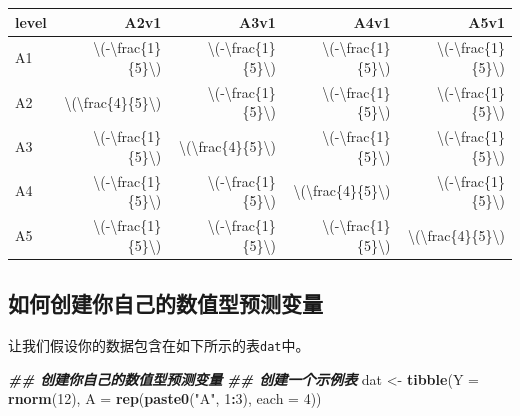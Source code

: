 \documentclass[
]{book}
\newenvironment{Shaded}{\begin{snugshade}}{\end{snugshade}}
\newcommand{\AttributeTok}[1]{\textcolor[rgb]{0.13,0.29,0.53}{#1}}
\newcommand{\DecValTok}[1]{\textcolor[rgb]{0.00,0.00,0.81}{#1}}
\newcommand{\DocumentationTok}[1]{\textcolor[rgb]{0.56,0.35,0.01}{\textbf{\textit{#1}}}}
\newcommand{\FunctionTok}[1]{\textcolor[rgb]{0.13,0.29,0.53}{\textbf{#1}}}
\newcommand{\NormalTok}[1]{#1}
\newcommand{\OtherTok}[1]{\textcolor[rgb]{0.56,0.35,0.01}{#1}}
\newcommand{\SpecialCharTok}[1]{\textcolor[rgb]{0.81,0.36,0.00}{\textbf{#1}}}
\newcommand{\StringTok}[1]{\textcolor[rgb]{0.31,0.60,0.02}{#1}}
\begin{document}
\begin{table}
\centering
\begin{tabular}{l|r|r|r|r}
\hline
level & A2v1 & A3v1 & A4v1 & A5v1\\
\hline
A1 & \textbackslash{}(-\textbackslash{}frac\{1\}\{5\}\textbackslash{}) & \textbackslash{}(-\textbackslash{}frac\{1\}\{5\}\textbackslash{}) & \textbackslash{}(-\textbackslash{}frac\{1\}\{5\}\textbackslash{}) & \textbackslash{}(-\textbackslash{}frac\{1\}\{5\}\textbackslash{})\\
\hline
A2 & \textbackslash{}(\textbackslash{}frac\{4\}\{5\}\textbackslash{}) & \textbackslash{}(-\textbackslash{}frac\{1\}\{5\}\textbackslash{}) & \textbackslash{}(-\textbackslash{}frac\{1\}\{5\}\textbackslash{}) & \textbackslash{}(-\textbackslash{}frac\{1\}\{5\}\textbackslash{})\\
\hline
A3 & \textbackslash{}(-\textbackslash{}frac\{1\}\{5\}\textbackslash{}) & \textbackslash{}(\textbackslash{}frac\{4\}\{5\}\textbackslash{}) & \textbackslash{}(-\textbackslash{}frac\{1\}\{5\}\textbackslash{}) & \textbackslash{}(-\textbackslash{}frac\{1\}\{5\}\textbackslash{})\\
\hline
A4 & \textbackslash{}(-\textbackslash{}frac\{1\}\{5\}\textbackslash{}) & \textbackslash{}(-\textbackslash{}frac\{1\}\{5\}\textbackslash{}) & \textbackslash{}(\textbackslash{}frac\{4\}\{5\}\textbackslash{}) & \textbackslash{}(-\textbackslash{}frac\{1\}\{5\}\textbackslash{})\\
\hline
A5 & \textbackslash{}(-\textbackslash{}frac\{1\}\{5\}\textbackslash{}) & \textbackslash{}(-\textbackslash{}frac\{1\}\{5\}\textbackslash{}) & \textbackslash{}(-\textbackslash{}frac\{1\}\{5\}\textbackslash{}) & \textbackslash{}(\textbackslash{}frac\{4\}\{5\}\textbackslash{})\\
\hline
\end{tabular}
\end{table}

\hypertarget{ux5982ux4f55ux521bux5efaux4f60ux81eaux5df1ux7684ux6570ux503cux578bux9884ux6d4bux53d8ux91cf}{%
\subsection{如何创建你自己的数值型预测变量}\label{ux5982ux4f55ux521bux5efaux4f60ux81eaux5df1ux7684ux6570ux503cux578bux9884ux6d4bux53d8ux91cf}}

让我们假设你的数据包含在如下所示的表\texttt{dat}中。

\begin{Shaded}
\begin{Highlighting}[]
 \DocumentationTok{\#\# 创建你自己的数值型预测变量}
 \DocumentationTok{\#\# 创建一个示例表}
\NormalTok{ dat }\OtherTok{\textless{}{-}} \FunctionTok{tibble}\NormalTok{(}\AttributeTok{Y =} \FunctionTok{rnorm}\NormalTok{(}\DecValTok{12}\NormalTok{),}
               \AttributeTok{A =} \FunctionTok{rep}\NormalTok{(}\FunctionTok{paste0}\NormalTok{(}\StringTok{"A"}\NormalTok{, }\DecValTok{1}\SpecialCharTok{:}\DecValTok{3}\NormalTok{), }\AttributeTok{each =} \DecValTok{4}\NormalTok{))}
\end{Highlighting}
\end{Shaded}
\end{document}
